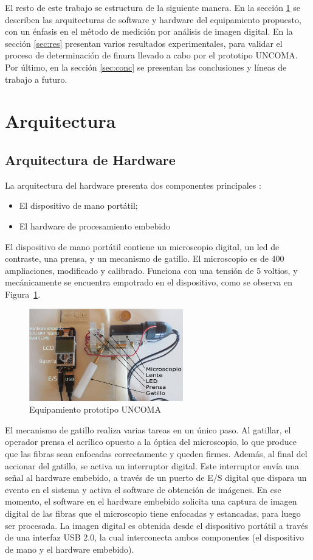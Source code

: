 \documentclass[runningheads,a4paper]{llncs}
\begin{document}
El resto de este trabajo se estructura de la siguiente manera. En la sección \ref{sec:arq} se describen
las arquitecturas de software y hardware del equipamiento propuesto, con un énfasis en
el método de medición por análisis de imagen digital. En la sección \ref{sec:res} presentan varios
resultados experimentales, para validar el proceso de determinación de finura llevado a cabo por el prototipo UNCOMA.
Por último, en la sección \ref{sec:conc} se presentan las conclusiones y líneas de trabajo a futuro.

\section{Arquitectura}\label{sec:arq}

\subsection{Arquitectura de Hardware}

La arquitectura del hardware presenta dos componentes principales :
\begin{itemize}
\item El dispositivo de mano portátil;
\item El hardware de procesamiento embebido
\end{itemize}

El dispositivo de mano portátil contiene un microscopio digital, un led de contraste, una prensa, y un mecanismo de gatillo.
El microscopio es de 400 ampliaciones, modificado y calibrado. Funciona con una tensión de 5 voltios, y mecánicamente se encuentra empotrado en el dispositivo, como se observa en Figura~\ref{fig:prototipo5}.
\begin{figure}
\centering
\includegraphics[height=4cm]{prototipo5}
\caption{Equipamiento prototipo UNCOMA}
\label{fig:prototipo5}
\end{figure}

El mecanismo de gatillo realiza varias tareas en un único paso. Al gatillar, el operador prensa el acrílico opuesto a la óptica del microscopio, lo que produce que las fibras sean enfocadas correctamente y queden firmes. Además, al final del accionar del gatillo, se activa un interruptor digital. Este interruptor envía una señal al hardware embebido, a través de un puerto de E/S digital que dispara un evento en el sistema y activa el software de obtención de imágenes.
En ese momento, el software en el hardware embebido solicita una captura de imagen digital de las fibras que el microscopio tiene enfocadas y estancadas, para luego ser procesada. La imagen digital es obtenida desde el dispositivo portátil a través de una interfaz USB 2.0, la cual interconecta ambos componentes (el dispositivo de mano y el hardware embebido).
\end{document}
